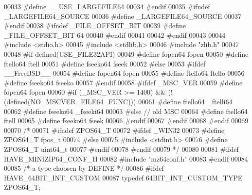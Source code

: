 \begin{DoxyCode}
00033 \textcolor{preprocessor}{                #define \_\_USE\_LARGEFILE64}
00034 \textcolor{preprocessor}{        #endif}
00035 \textcolor{preprocessor}{        #ifndef \_LARGEFILE64\_SOURCE}
00036 \textcolor{preprocessor}{                #define \_LARGEFILE64\_SOURCE}
00037 \textcolor{preprocessor}{        #endif}
00038 \textcolor{preprocessor}{        #ifndef \_FILE\_OFFSET\_BIT}
00039 \textcolor{preprocessor}{                #define \_FILE\_OFFSET\_BIT 64}
00040 \textcolor{preprocessor}{        #endif}
00041 
00042 \textcolor{preprocessor}{#endif}
00043 
00044 \textcolor{preprocessor}{#include <stdio.h>}
00045 \textcolor{preprocessor}{#include <stdlib.h>}
00046 \textcolor{preprocessor}{#include "zlib.h"}
00047 
00048 \textcolor{preprocessor}{#if defined(USE\_FILE32API)}
00049 \textcolor{preprocessor}{#define fopen64 fopen}
00050 \textcolor{preprocessor}{#define ftello64 ftell}
00051 \textcolor{preprocessor}{#define fseeko64 fseek}
00052 \textcolor{preprocessor}{#else}
00053 \textcolor{preprocessor}{#ifdef \_\_FreeBSD\_\_}
00054 \textcolor{preprocessor}{#define fopen64 fopen}
00055 \textcolor{preprocessor}{#define ftello64 ftello}
00056 \textcolor{preprocessor}{#define fseeko64 fseeko}
00057 \textcolor{preprocessor}{#endif}
00058 \textcolor{preprocessor}{#ifdef \_MSC\_VER}
00059 \textcolor{preprocessor}{ #define fopen64 fopen}
00060 \textcolor{preprocessor}{ #if (\_MSC\_VER >= 1400) && (!(defined(NO\_MSCVER\_FILE64\_FUNC)))}
00061 \textcolor{preprocessor}{  #define ftello64 \_ftelli64}
00062 \textcolor{preprocessor}{  #define fseeko64 \_fseeki64}
00063 \textcolor{preprocessor}{ #else // old MSC}
00064 \textcolor{preprocessor}{  #define ftello64 ftell}
00065 \textcolor{preprocessor}{  #define fseeko64 fseek}
00066 \textcolor{preprocessor}{ #endif}
00067 \textcolor{preprocessor}{#endif}
00068 \textcolor{preprocessor}{#endif}
00069 
00070 \textcolor{comment}{/*}
00071 \textcolor{comment}{#ifndef ZPOS64\_T}
00072 \textcolor{comment}{  #ifdef \_WIN32}
00073 \textcolor{comment}{                #define ZPOS64\_T fpos\_t}
00074 \textcolor{comment}{  #else}
00075 \textcolor{comment}{    #include <stdint.h>}
00076 \textcolor{comment}{    #define ZPOS64\_T uint64\_t}
00077 \textcolor{comment}{  #endif}
00078 \textcolor{comment}{#endif}
00079 \textcolor{comment}{*/}
00080 
00081 \textcolor{preprocessor}{#ifdef HAVE\_MINIZIP64\_CONF\_H}
00082 \textcolor{preprocessor}{#include "mz64conf.h"}
00083 \textcolor{preprocessor}{#endif}
00084 
00085 \textcolor{comment}{/* a type choosen by DEFINE */}
00086 \textcolor{preprocessor}{#ifdef HAVE\_64BIT\_INT\_CUSTOM}
00087 \textcolor{keyword}{typedef}  64BIT\_INT\_CUSTOM\_TYPE ZPOS64\_T;

\end{DoxyCode}
